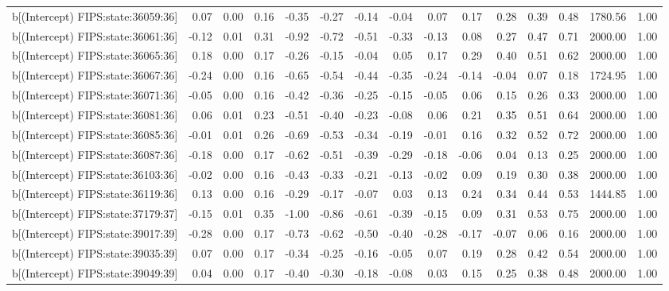 \begin{table}[ht]
\begin{tabular}{rrrrrrrrrrrrrrr}
  b[(Intercept) FIPS:state:36059:36] & 0.07 & 0.00 & 0.16 & -0.35 & -0.27 & -0.14 & -0.04 & 0.07 & 0.17 & 0.28 & 0.39 & 0.48 & 1780.56 & 1.00 \\ 
  b[(Intercept) FIPS:state:36061:36] & -0.12 & 0.01 & 0.31 & -0.92 & -0.72 & -0.51 & -0.33 & -0.13 & 0.08 & 0.27 & 0.47 & 0.71 & 2000.00 & 1.00 \\ 
  b[(Intercept) FIPS:state:36065:36] & 0.18 & 0.00 & 0.17 & -0.26 & -0.15 & -0.04 & 0.05 & 0.17 & 0.29 & 0.40 & 0.51 & 0.62 & 2000.00 & 1.00 \\ 
  b[(Intercept) FIPS:state:36067:36] & -0.24 & 0.00 & 0.16 & -0.65 & -0.54 & -0.44 & -0.35 & -0.24 & -0.14 & -0.04 & 0.07 & 0.18 & 1724.95 & 1.00 \\ 
  b[(Intercept) FIPS:state:36071:36] & -0.05 & 0.00 & 0.16 & -0.42 & -0.36 & -0.25 & -0.15 & -0.05 & 0.06 & 0.15 & 0.26 & 0.33 & 2000.00 & 1.00 \\ 
  b[(Intercept) FIPS:state:36081:36] & 0.06 & 0.01 & 0.23 & -0.51 & -0.40 & -0.23 & -0.08 & 0.06 & 0.21 & 0.35 & 0.51 & 0.64 & 2000.00 & 1.00 \\ 
  b[(Intercept) FIPS:state:36085:36] & -0.01 & 0.01 & 0.26 & -0.69 & -0.53 & -0.34 & -0.19 & -0.01 & 0.16 & 0.32 & 0.52 & 0.72 & 2000.00 & 1.00 \\ 
  b[(Intercept) FIPS:state:36087:36] & -0.18 & 0.00 & 0.17 & -0.62 & -0.51 & -0.39 & -0.29 & -0.18 & -0.06 & 0.04 & 0.13 & 0.25 & 2000.00 & 1.00 \\ 
  b[(Intercept) FIPS:state:36103:36] & -0.02 & 0.00 & 0.16 & -0.43 & -0.33 & -0.21 & -0.13 & -0.02 & 0.09 & 0.19 & 0.30 & 0.38 & 2000.00 & 1.00 \\ 
  b[(Intercept) FIPS:state:36119:36] & 0.13 & 0.00 & 0.16 & -0.29 & -0.17 & -0.07 & 0.03 & 0.13 & 0.24 & 0.34 & 0.44 & 0.53 & 1444.85 & 1.00 \\ 
  b[(Intercept) FIPS:state:37179:37] & -0.15 & 0.01 & 0.35 & -1.00 & -0.86 & -0.61 & -0.39 & -0.15 & 0.09 & 0.31 & 0.53 & 0.75 & 2000.00 & 1.00 \\ 
  b[(Intercept) FIPS:state:39017:39] & -0.28 & 0.00 & 0.17 & -0.73 & -0.62 & -0.50 & -0.40 & -0.28 & -0.17 & -0.07 & 0.06 & 0.16 & 2000.00 & 1.00 \\ 
  b[(Intercept) FIPS:state:39035:39] & 0.07 & 0.00 & 0.17 & -0.34 & -0.25 & -0.16 & -0.05 & 0.07 & 0.19 & 0.28 & 0.42 & 0.54 & 2000.00 & 1.00 \\ 
  b[(Intercept) FIPS:state:39049:39] & 0.04 & 0.00 & 0.17 & -0.40 & -0.30 & -0.18 & -0.08 & 0.03 & 0.15 & 0.25 & 0.38 & 0.48 & 2000.00 & 1.00 \\ 

\end{tabular}
\end{table}
